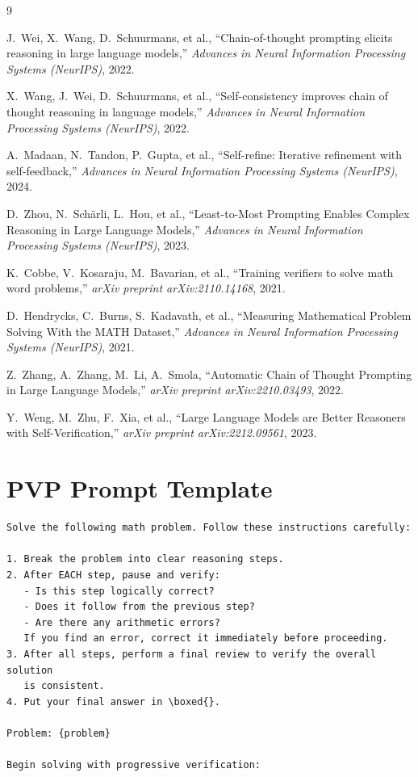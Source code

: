 \documentclass[conference]{IEEEtran}
\begin{document}
\begin{thebibliography}{9}

J.~Wei, X.~Wang, D.~Schuurmans, et al.,
``Chain-of-thought prompting elicits reasoning in large language models,''
\textit{Advances in Neural Information Processing Systems (NeurIPS)}, 2022.

X.~Wang, J.~Wei, D.~Schuurmans, et al.,
``Self-consistency improves chain of thought reasoning in language models,''
\textit{Advances in Neural Information Processing Systems (NeurIPS)}, 2022.

A.~Madaan, N.~Tandon, P.~Gupta, et al.,
``Self-refine: Iterative refinement with self-feedback,''
\textit{Advances in Neural Information Processing Systems (NeurIPS)}, 2024.

D.~Zhou, N.~Sch\"{a}rli, L.~Hou, et al.,
``Least-to-Most Prompting Enables Complex Reasoning in Large Language Models,''
\textit{Advances in Neural Information Processing Systems (NeurIPS)}, 2023.

K.~Cobbe, V.~Kosaraju, M.~Bavarian, et al.,
``Training verifiers to solve math word problems,''
\textit{arXiv preprint arXiv:2110.14168}, 2021.

D.~Hendrycks, C.~Burns, S.~Kadavath, et al.,
``Measuring Mathematical Problem Solving With the MATH Dataset,''
\textit{Advances in Neural Information Processing Systems (NeurIPS)}, 2021.

Z.~Zhang, A.~Zhang, M.~Li, A.~Smola,
``Automatic Chain of Thought Prompting in Large Language Models,''
\textit{arXiv preprint arXiv:2210.03493}, 2022.

Y.~Weng, M.~Zhu, F.~Xia, et al.,
``Large Language Models are Better Reasoners with Self-Verification,''
\textit{arXiv preprint arXiv:2212.09561}, 2023.

\end{thebibliography}

\appendices

\section{PVP Prompt Template}
\label{sec:pvp_prompt}

\begin{lstlisting}
Solve the following math problem. Follow these instructions carefully:

1. Break the problem into clear reasoning steps.
2. After EACH step, pause and verify:
   - Is this step logically correct?
   - Does it follow from the previous step?
   - Are there any arithmetic errors?
   If you find an error, correct it immediately before proceeding.
3. After all steps, perform a final review to verify the overall solution
   is consistent.
4. Put your final answer in \boxed{}.

Problem: {problem}

Begin solving with progressive verification:
\end{lstlisting}
\end{document}
